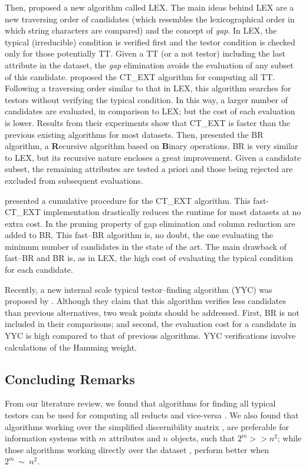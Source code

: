 \documentclass[authoryear,preprint,review,12pt]{elsarticle}
\begin{document}
  Then, \cite{Santiesteban03} proposed a new algorithm called LEX. The main ideas behind LEX are a new traversing
  order of candidates (which resembles the lexicographical order in which string characters are compared) and the
  concept of \emph{gap}. In LEX, the typical (irreducible) condition is verified first and the testor condition 
  is checked only for those potentially TT. Given a TT (or a not testor) including the last attribute in the
  dataset, the \emph{gap} elimination avoids the evaluation of any subset of this candidate. \cite{Sanchez07}
  proposed the CT\_EXT algorithm for computing all TT. Following a traversing order similar to that in LEX, this
  algorithm searches for testors without verifying the typical condition. In this way, a larger number of 
  candidates are evaluated, in comparison to LEX; but the cost of each evaluation is lower. Results from their
  experiments show that CT\_EXT is faster than the previous existing algorithms for most datasets. Then,
  \cite{Lias09} presented the BR algorithm, a \textbf{R}ecursive algorithm based on \textbf{B}inary operations. 
  BR is very similar to LEX, but its recursive nature encloses a great improvement. Given a candidate subset, the 
  remaining attributes are tested a priori and those being rejected are excluded from subsequent evaluations. 
  
  \cite{Sanchez10} presented a cumulative procedure for the CT\_EXT algorithm. This fast-CT\_EXT implementation
  drastically reduces the runtime for most datasets at no extra cost. In \citep{Lias13} the pruning property of
  gap elimination and column reduction are added to BR. This fast--BR algorithm is, no doubt, the one 
  evaluating the minimum number of candidates in the state of the art. The main drawback of fast--BR and 
  BR is, as in LEX, the high cost of evaluating the typical condition for each candidate.
  
  Recently, a new internal scale typical testor--finding algorithm (YYC) was proposed by \cite{Alba14}. 
  Although they claim that this algorithm verifies less candidates than previous alternatives, two weak points
  should be addressed. First, BR is not included in their comparisons; and second, the evaluation cost for a
  candidate in YYC is high compared to that of previous algorithms. YYC verifications involve calculations of the 
  Hamming weight.
  
 \subsection{Concluding Remarks} 
  From our literature review, we found that algorithms for finding all typical testors can be used for computing all reducts and vice-versa \citep{Lazo15}. We also found that algorithms working over the simplified discernibility matrix \citep{Sanchez10,Chen2012,Lias13}, are preferable for information systems with $m$ attributes and $n$ objects, such that $2^m >> n^2$; while those algorithms working directly over the dataset \citep{Shulcloper95b,WangP07}, perform better when $2^m~\sim~n^2$. 
  
\end{document}
